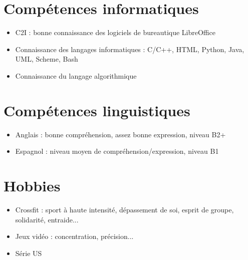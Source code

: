 \documentclass[a4paper]{article}
\begin{document}
\section*{Compétences informatiques}

\begin{itemize}
\item C2I : bonne connaissance des logiciels de bureautique LibreOffice
\item Connaissance des langages informatiques : C/C++, HTML, Python, Java, UML, Scheme, Bash
\item Connaissance du langage algorithmique
\end{itemize}

\section*{Compétences linguistiques}
\begin{itemize}
\item Anglais : bonne compréhension, assez bonne expression, niveau B2+
\item Espagnol : niveau moyen de compréhension/expression, niveau B1
\end{itemize}

\section*{Hobbies}
\begin{itemize}
\item Crossfit : sport à haute intensité, dépassement de soi, esprit de groupe, solidarité, entraide...
\item Jeux vidéo : concentration, précision...
\item Série US
\end{itemize}
    
\end{document}
